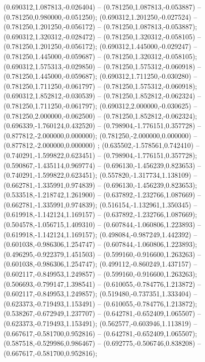  (0.690312,1.087813,-0.026404) -- (0.781250,1.087813,-0.053887) -- (0.781250,0.980000,-0.051250);
 (0.690312,1.201250,-0.027524) -- (0.781250,1.201250,-0.056172) -- (0.781250,1.087813,-0.053887);
 (0.690312,1.320312,-0.028472) -- (0.781250,1.320312,-0.058105) -- (0.781250,1.201250,-0.056172);
 (0.690312,1.445000,-0.029247) -- (0.781250,1.445000,-0.059687) -- (0.781250,1.320312,-0.058105);
 (0.690312,1.575313,-0.029850) -- (0.781250,1.575312,-0.060918) -- (0.781250,1.445000,-0.059687);
 (0.690312,1.711250,-0.030280) -- (0.781250,1.711250,-0.061797) -- (0.781250,1.575312,-0.060918);
 (0.690312,1.852812,-0.030539) -- (0.781250,1.852812,-0.062324) -- (0.781250,1.711250,-0.061797);
 (0.690312,2.000000,-0.030625) -- (0.781250,2.000000,-0.062500) -- (0.781250,1.852812,-0.062324);
 (0.696339,-1.760124,0.432520) -- (0.798904,-1.776151,0.357728) -- (0.877812,-2.000000,0.000000);
 (0.781250,-2.000000,0.000000) -- (0.877812,-2.000000,0.000000) ;
 (0.635502,-1.578561,0.742410) -- (0.740291,-1.599822,0.623451) -- (0.798904,-1.776151,0.357728);
 (0.590867,-1.435114,0.969774) -- (0.696130,-1.456239,0.823653) -- (0.740291,-1.599822,0.623451);
 (0.557820,-1.317734,1.138109) -- (0.662781,-1.335991,0.974839) -- (0.696130,-1.456239,0.823653);
 (0.533518,-1.218742,1.261900) -- (0.637892,-1.232766,1.087669) -- (0.662781,-1.335991,0.974839);
 (0.516154,-1.132961,1.350345) -- (0.619918,-1.142124,1.169157) -- (0.637892,-1.232766,1.087669);
 (0.504578,-1.056715,1.409310) -- (0.607844,-1.060806,1.223893) -- (0.619918,-1.142124,1.169157);
 (0.498084,-0.987249,1.442392) -- (0.601038,-0.986306,1.254747) -- (0.607844,-1.060806,1.223893);
 (0.496295,-0.922379,1.451503) -- (0.599160,-0.916600,1.263263) -- (0.601038,-0.986306,1.254747);
 (0.499112,-0.860249,1.437157) -- (0.602117,-0.849953,1.249857) -- (0.599160,-0.916600,1.263263);
 (0.506693,-0.799147,1.398541) -- (0.610055,-0.784776,1.213872) -- (0.602117,-0.849953,1.249857);
 (0.519480,-0.737351,1.333404) -- (0.623373,-0.719493,1.153491) -- (0.610055,-0.784776,1.213872);
 (0.538267,-0.672949,1.237707) -- (0.642781,-0.652409,1.065507) -- (0.623373,-0.719493,1.153491);
 (0.562577,-0.603946,1.113819) -- (0.667617,-0.581700,0.952816) -- (0.642781,-0.652409,1.065507);
 (0.587518,-0.529986,0.986467) -- (0.692775,-0.506746,0.838208) -- (0.667617,-0.581700,0.952816);
